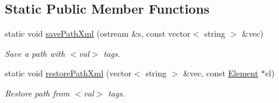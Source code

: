 \subsection*{Static Public Member Functions}
\begin{DoxyCompactItemize}
\item 
static void \mbox{\hyperlink{class_scope_internal_adf1804d94e0238692125668e0813ac94}{save\+Path\+Xml}} (ostream \&s, const vector$<$ string $>$ \&vec)
\begin{DoxyCompactList}\small\item\em Save a path with $<$val$>$ tags. \end{DoxyCompactList}\item 
static void \mbox{\hyperlink{class_scope_internal_a45de50d5d7b6ab09d72cbf5861f50b3f}{restore\+Path\+Xml}} (vector$<$ string $>$ \&vec, const \mbox{\hyperlink{class_element}{Element}} $\ast$el)
\begin{DoxyCompactList}\small\item\em Restore path from $<$val$>$ tags. \end{DoxyCompactList}\end{DoxyCompactItemize}
